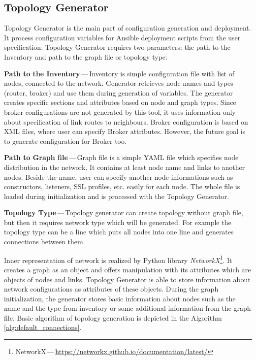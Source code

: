 \subsection{Topology Generator}
Topology Generator is the main part of configuration generation and deployment. It process configuration variables for Ansible deployment scripts from the user specification. Topology Generator requires two parameters: the path to the Inventory and path to the graph file or topology type:

\begin{description}
	\item \textbf{Path to the Inventory}\,---\,Inventory is simple configuration file with list of nodes, connected to the network. Generator retrieves node names and types (router, broker) and use them during generation of variables. The generator creates specific sections and attributes based on node and graph types. Since broker configurations are not generated by this tool, it uses information only about specification of link routes to neighbours. Broker configuration is based on XML files, where user can specify Broker attributes. However, the future goal is to generate configuration for Broker too.
	\item \textbf{Path to Graph file}\,---\,Graph file is a simple YAML file which specifies node distribution in the network. It contains at least node name and links to another nodes. Beside the name, user can specify another node informations such as constructors, listeners, SSL profiles, etc. easily for each node. The whole file is loaded during initialization and is processed with the Topology Generator.
	\item \textbf{Topology Type}\,---\,Topology generator can create topology without graph file, but then it requires network type which will be generated. For example the topology type can be a line which puts all nodes into one line and generates connections between them.
\end{description}

Inner representation of network is realized by Python library \emph{NetworkX}\footnote{NetworkX\,---\,\url{https://networkx.github.io/documentation/latest/}}. It creates a graph as an object and offers manipulation with its attributes which are objects of nodes and links. Topology Generator is able to store information about network configurations as attributes of these objects. During the graph initialization, the generator stores basic information about nodes such as the name and the type from inventory or some additional information from the graph file. Basic algorithm of topology generation is depicted in the Algorithm \ref{alg:default_connections}.

